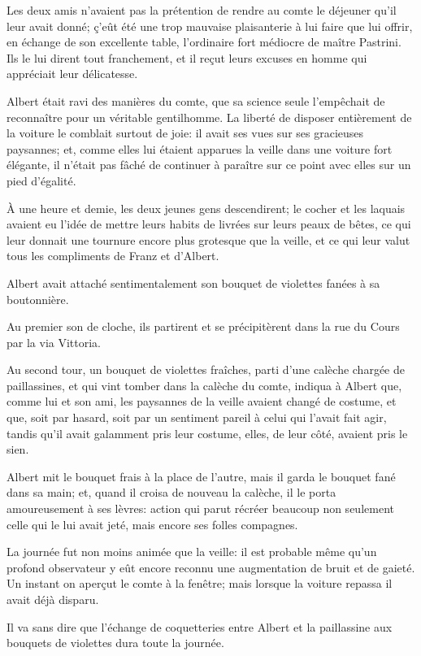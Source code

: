 Les deux amis n'avaient pas la prétention de rendre au comte le déjeuner qu'il leur avait donné; ç'eût été une trop mauvaise plaisanterie à lui faire que lui offrir, en échange de son excellente table, l'ordinaire fort médiocre de maître Pastrini. Ils le lui dirent tout franchement, et il reçut leurs excuses en homme qui appréciait leur délicatesse. 

Albert était ravi des manières du comte, que sa science seule l'empêchait de reconnaître pour un véritable gentilhomme. La liberté de disposer entièrement de la voiture le comblait surtout de joie: il avait ses vues sur ses gracieuses paysannes; et, comme elles lui étaient apparues la veille dans une voiture fort élégante, il n'était pas fâché de continuer à paraître sur ce point avec elles sur un pied d'égalité. 

À une heure et demie, les deux jeunes gens descendirent; le cocher et les laquais avaient eu l'idée de mettre leurs habits de livrées sur leurs peaux de bêtes, ce qui leur donnait une tournure encore plus grotesque que la veille, et ce qui leur valut tous les compliments de Franz et d'Albert.  

Albert avait attaché sentimentalement son bouquet de violettes fanées à sa boutonnière. 

Au premier son de cloche, ils partirent et se précipitèrent dans la rue du Cours par la via Vittoria. 

Au second tour, un bouquet de violettes fraîches, parti d'une calèche chargée de paillassines, et qui vint tomber dans la calèche du comte, indiqua à Albert que, comme lui et son ami, les paysannes de la veille avaient changé de costume, et que, soit par hasard, soit par un sentiment pareil à celui qui l'avait fait agir, tandis qu'il avait galamment pris leur costume, elles, de leur côté, avaient pris le sien. 

Albert mit le bouquet frais à la place de l'autre, mais il garda le bouquet fané dans sa main; et, quand il croisa de nouveau la calèche, il le porta amoureusement à ses lèvres: action qui parut récréer beaucoup non seulement celle qui le lui avait jeté, mais encore ses folles compagnes. 

La journée fut non moins animée que la veille: il est probable même qu'un profond observateur y eût encore reconnu une augmentation de bruit et de gaieté. Un instant on aperçut le comte à la fenêtre; mais lorsque la voiture repassa il avait déjà disparu. 

Il va sans dire que l'échange de coquetteries entre Albert et la paillassine aux bouquets de violettes dura toute la journée.  

